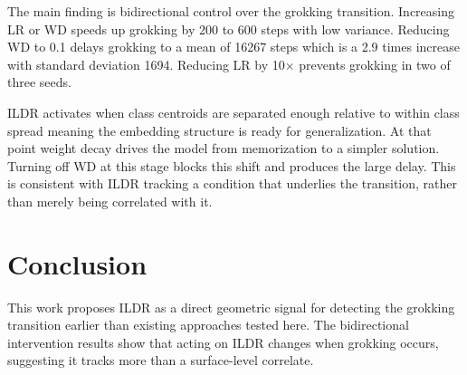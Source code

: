 \documentclass{article}
\begin{document}
\begin{table}[H]
\vspace{0.8em}

\caption{Intervention experiment.
\textit{Top}: per-seed results showing grokking step, intervention trigger step,
hyperparameter changes, and lead (steps saved vs.\ baseline).
Interventions are applied at the ILDR flag and reverted 500 steps later.
\textit{Bottom}: aggregate statistics across three seeds per config.}
\label{tab:intervention}
\end{table}

The main finding is bidirectional control over the grokking transition. Increasing LR or WD speeds up grokking by 200 to 600 steps with low variance. Reducing WD to 0.1 delays grokking to a mean of 16267 steps which is a 2.9 times increase with standard deviation 1694. Reducing LR by 10× prevents grokking in two of three seeds.

\vspace{3pt}

ILDR activates when class centroids are separated enough relative to within class spread meaning the embedding structure is ready for generalization. At that point weight decay drives the model from memorization to a simpler solution. Turning off WD at this stage blocks this shift and produces the large delay. This is consistent with ILDR tracking a condition that underlies the transition, rather than merely being correlated with it.

\section{Conclusion}

This work proposes ILDR as a direct geometric signal for detecting the grokking transition earlier than existing approaches tested here. The bidirectional intervention results show that acting on ILDR changes when grokking occurs, suggesting it tracks more than a surface-level correlate. 
\end{document}
